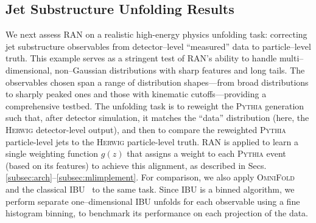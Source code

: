     \subsection{Jet Substructure Unfolding Results}
        We next assess RAN on a realistic high-energy physics unfolding task: correcting jet substructure observables from detector--level “measured” data to particle--level truth.
        This example serves as a stringent test of RAN’s ability to handle multi--dimensional, non--Gaussian distributions with sharp features and long tails.
        The observables chosen span a range of distribution shapes---from broad distributions to sharply peaked ones and those with kinematic cutoffs---providing a comprehensive testbed.
        The unfolding task is to reweight the \textsc{Pythia} generation such that, after detector simulation, it matches the “data” distribution (here, the \textsc{Herwig} detector-level output), and then to compare the reweighted \textsc{Pythia} particle-level jets to the \textsc{Herwig} particle-level truth.
        RAN is applied to learn a single weighting function $g(z)$ that assigns a weight to each \textsc{Pythia} event (based on its features) to achieve this alignment, as described in Secs.\ref{subsec:arch}–\ref{subsec:mlimplement}.
        For comparison, we also apply \textsc{OmniFold}~ and the classical IBU~ to the same task.
        Since IBU is a binned algorithm, we perform separate one--dimensional IBU unfolds for each observable using a fine histogram binning, to benchmark its performance on each projection of the data.

